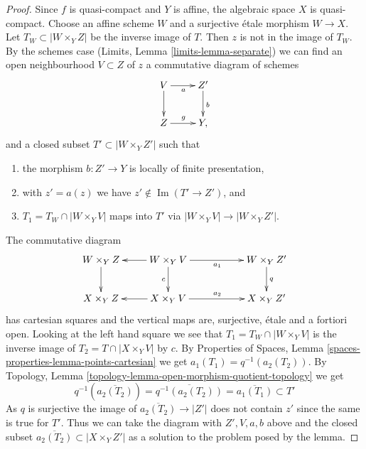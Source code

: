 \documentclass{stacks-project}
\theoremstyle{plain}
\theoremstyle{definition}
\theoremstyle{remark}
\numberwithin{equation}{subsection}
\def\Im{\mathop{\mathrm{Im}}}
\begin{document}
\begin{proof}
\medskip\noindent
Since $f$ is quasi-compact and $Y$ is affine, the algebraic space
$X$ is quasi-compact. Choose an affine scheme $W$ and a surjective
\'etale morphism $W \to X$. Let $T_W \subset |W \times_Y Z|$
be the inverse image of $T$. Then $z$ is not in the image of
$T_W$. By the schemes case (Limits, Lemma \ref{limits-lemma-separate})
we can find an open neighbourhood $V \subset Z$ of $z$
a commutative diagram of schemes
$$
\xymatrix{
V \ar[d] \ar[r]_a & Z' \ar[d]^b \\
Z \ar[r]^g & Y,
}
$$
and a closed subset $T' \subset |W \times_Y Z'|$ such that
\begin{enumerate}
\item the morphism $b : Z' \to Y$ is locally of finite presentation,
\item with $z' = a(z)$ we have $z' \not \in \Im(T' \to Z')$, and
\item $T_1 = T_W \cap |W \times_Y V|$ maps into $T'$ via
$|W \times_Y V| \to |W \times_Y Z'|$.
\end{enumerate}
The commutative diagram
$$
\xymatrix{
W \times_Y Z \ar[d] &
W \times_Y V \ar[l] \ar[rr]_{a_1} \ar[d]_c & &
W \times_Y Z' \ar[d]^q \\
X \times_Y Z &
X \times_Y V \ar[l] \ar[rr]^{a_2} & &
X \times_Y Z'
}
$$
has cartesian squares and the vertical maps are, surjective, \'etale
and a fortiori open. Looking at the left hand square we
see that $T_1 = T_W \cap |W \times_Y V|$ is the inverse image of
$T_2 = T \cap |X \times_Y V|$ by $c$. By Properties of Spaces, Lemma
\ref{spaces-properties-lemma-points-cartesian} we get
$a_1(T_1) = q^{-1}(a_2(T_2))$.
By Topology, Lemma \ref{topology-lemma-open-morphism-quotient-topology}
we get
$$
q^{-1}\left(\overline{a_2(T_2)}\right) =
\overline{q^{-1}(a_2(T_2))} =
\overline{a_1(T_1)} \subset T'
$$
As $q$ is surjective the image of $\overline{a_2(T_2)} \to |Z'|$
does not contain $z'$ since the same is true for $T'$.
Thus we can take the diagram with $Z', V, a, b$ above and the
closed subset $\overline{a_2(T_2)} \subset |X \times_Y Z'|$ as
a solution to the problem posed by the lemma.
\end{proof}
\end{document}

